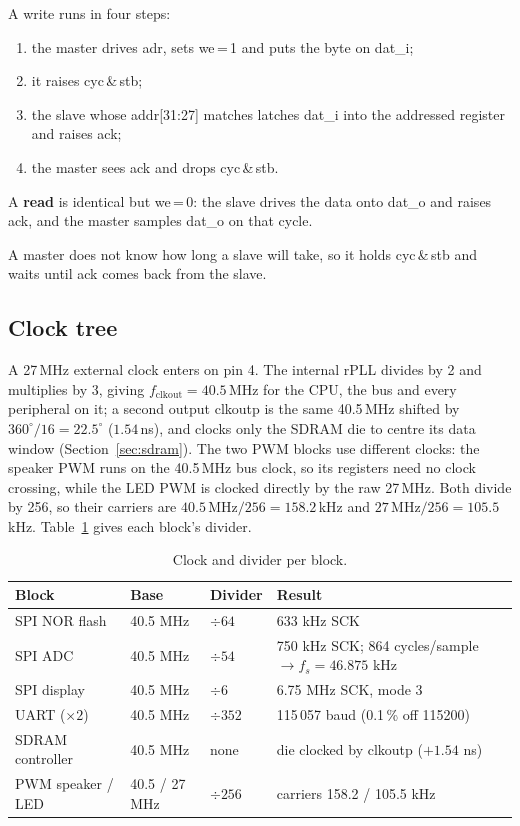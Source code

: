 \documentclass[a4paper,10pt]{article}
\begin{document}
A write runs in four steps:
\begin{enumerate}\setlength{\itemsep}{0pt}
\item the master drives adr, sets we\,=\,1 and puts the byte on dat\_i;
\item it raises cyc\,\&\,stb;
\item the slave whose addr[31:27] matches latches dat\_i into the addressed register and raises ack;
\item the master sees ack and drops cyc\,\&\,stb.
\end{enumerate}

A \textbf{read} is identical but
we\,=\,0: the slave drives the data onto dat\_o and raises
ack, and the master samples dat\_o on that cycle.

A master does not know how long a slave will take, so it holds cyc\,\&\,stb
and waits until ack comes back from the slave.


\subsection{Clock tree}
\label{sec:clocks}

A 27\,MHz external clock enters on pin 4. The internal rPLL divides by 2 and multiplies by 3,
giving $f_\mathrm{clkout}=40.5$\,MHz for the CPU, the bus and every peripheral on it;
a second output clkoutp is the same 40.5\,MHz shifted by
$360^{\circ}/16=22.5^{\circ}$ ($1.54$\,ns), and clocks only the SDRAM die to
centre its data window (Section~\ref{sec:sdram}). The two PWM blocks use different clocks:
the speaker PWM runs on the 40.5\,MHz bus clock, so its registers need no clock crossing,
while the LED PWM is clocked directly by the raw 27\,MHz. Both divide by 256, so their
carriers are $40.5\,\mathrm{MHz}/256 = 158.2$\,kHz and $27\,\mathrm{MHz}/256 = 105.5$\,kHz.
Table~\ref{tab:dividers} gives each block's divider.

\begin{table}[H]
\centering
\caption{Clock and divider per block.}
\label{tab:dividers}
\small
\begin{tabular}{llll}
\toprule
\textbf{Block} & \textbf{Base} & \textbf{Divider} & \textbf{Result} \\
\midrule
SPI NOR flash & 40.5 MHz & $\div 64$ & 633 kHz SCK \\
SPI ADC & 40.5 MHz & $\div 54$ & 750 kHz SCK; 864 cycles/sample $\to f_s=46.875$ kHz \\
SPI display & 40.5 MHz & $\div 6$ & 6.75 MHz SCK, mode 3 \\
UART ($\times2$) & 40.5 MHz & $\div 352$ & 115\,057 baud (0.1\,\% off 115200) \\
SDRAM controller & 40.5 MHz & none & die clocked by clkoutp ($+1.54$ ns) \\
PWM speaker / LED & 40.5 / 27 MHz & $\div 256$ & carriers 158.2 / 105.5 kHz \\
\bottomrule
\end{tabular}
\end{table}
\end{document}
